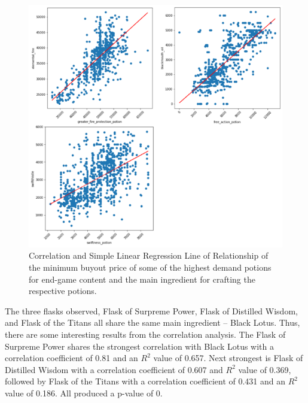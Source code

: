 \documentclass[sigconf]{acmart}
\begin{document}
\begin{figure}[h]
\centering
\includegraphics[width=\linewidth]{pot_corr}
\caption{Correlation and Simple Linear Regression Line of Relationship of the minimum buyout price of some of the highest demand potions for end-game content and the main ingredient for crafting the respective potions.}
\end{figure}

The three flasks observed, Flask of Surpreme Power, Flask of Distilled Wisdom, and Flask of the Titans all share the same main ingredient – Black Lotus. Thus, there are some interesting results from the correlation analysis. The Flask of Surpreme Power shares the strongest correlation with Black Lotus with a correlation coefficient of 0.81 and an \( R^2 \) value of 0.657. Next strongest is Flask of Distilled Wisdom with a correlation coefficient of 0.607 and \( R^2 \) value of 0.369, followed by Flask of the Titans with a correlation coefficient of 0.431 and an \( R^2 \) value of 0.186. All produced a p-value of 0.
\end{document}
